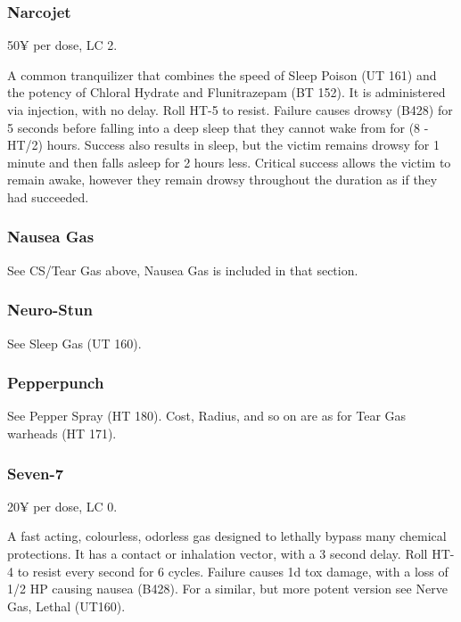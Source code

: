 \subsubsection{Narcojet}
\begin{flushleft}
	50¥ per dose, LC 2. 
\end{flushleft}

A common tranquilizer that combines the speed of Sleep Poison (UT 161) and the potency of Chloral Hydrate and Flunitrazepam (BT 152). It is administered via injection, with no delay. Roll HT-5 to resist. Failure causes drowsy (B428) for 5 seconds before falling into a deep sleep that they cannot wake from for (8 - HT/2) hours. Success also results in sleep, but the victim remains drowsy for 1 minute and then falls asleep for 2 hours less. Critical success allows the victim to remain awake, however they remain drowsy throughout the duration as if they had succeeded.

\subsubsection{Nausea Gas}

See CS/Tear Gas above, Nausea Gas is included in that section.

\subsubsection{Neuro-Stun}
	
See Sleep Gas (UT 160).

\subsubsection{Pepperpunch}

See Pepper Spray (HT 180). Cost, Radius, and so on are as for Tear Gas warheads (HT 171).

\subsubsection{Seven-7}
\begin{flushleft}
	20¥ per dose, LC 0. 
\end{flushleft}

A fast acting, colourless, odorless gas designed to lethally bypass many chemical protections. It has a contact or inhalation vector, with a 3 second delay. Roll HT-4 to resist every second for  6 cycles. Failure causes 1d tox damage, with a loss of 1/2 HP causing nausea (B428). For a similar, but more potent version see Nerve Gas, Lethal (UT160).


